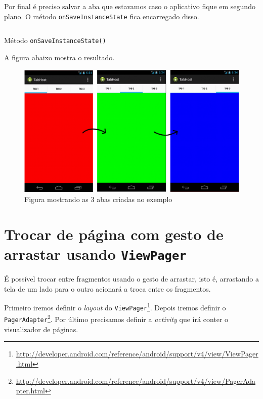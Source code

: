 \documentclass[a4paper,12pt,brazil]{book}
\begin{document}
\begin{singlespace}
	Por final é preciso salvar a aba que estavamos caso o aplicativo fique em segundo plano. O método \texttt{onSaveInstanceState} fica encarregado disso.
	
	\begin{listing}[H]
	\inputminted[linenos=true,fontsize=\small,frame=lines, framesep=2mm, tabsize=2,numbersep=5pt]{java}{src/design/onsavetab.java}
	\caption{Método \texttt{onSaveInstanceState()}}
	\end{listing}
	
	A figura abaixo mostra o resultado.
	
	\begin{figure}[H]
	  \centering
	  \includegraphics[width=1\textwidth]{figuras/design/tabs-rgb.jpg}
	  \caption{Figura mostrando as 3 abas criadas no exemplo}
	  \label{fig:e}
	\end{figure}
	
	
\section{Trocar de página com gesto de arrastar usando \texttt{ViewPager}}

	É possível trocar entre fragmentos usando o gesto de arrastar, isto é, arrastando a tela de um lado para o outro acionará a troca entre os fragmentos. 
	
	Primeiro iremos definir o \emph{layout} do \texttt{ViewPager}\footnote{\href{http://developer.android.com/reference/android/support/v4/view/ViewPager.html}{http://developer.android.com/reference/android/support/v4/view/ViewPager.html}}. Depois iremos definir o \texttt{PagerAdapter}\footnote{\href{http://developer.android.com/reference/android/support/v4/view/PagerAdapter.html}{http://developer.android.com/reference/android/support/v4/view/PagerAdapter.html}}. Por último precisamos definir a \emph{activity} que irá conter o visualizador de páginas. 
	

\end{singlespace}
\end{document}
